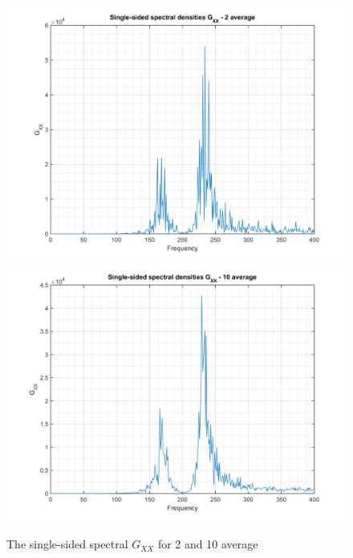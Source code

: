 \documentclass[14pt,a4paper]{article}
\begin{document}
\begin{figure}[htp]
	\centering
	\includegraphics[scale=0.4]{fn4_VB3_2.png}
	\includegraphics[scale=0.4]{fn4_VB3_4.png}
	\caption{The single-sided spectral $G_{XX}$ for 2 and 10 average}
\end{figure}\\
\pagebreak
\end{document}
